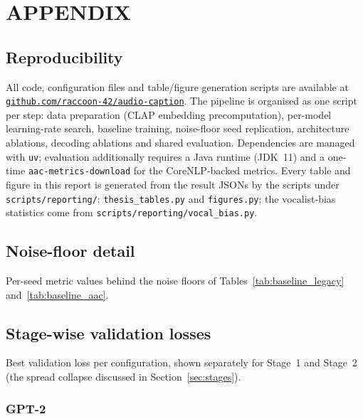 \documentclass[9pt]{report}
\begin{document}
\appendix
\chapter{APPENDIX}

\section{Reproducibility}
\begin{sloppypar}
All code, configuration files and table/figure generation scripts are available at
\href{https://github.com/raccoon-42/audio-caption}{\texttt{github.com/raccoon-42/audio-caption}}.
The pipeline is organised as one script per step: data preparation (CLAP embedding
precomputation), per-model learning-rate search, baseline training, noise-floor seed
replication, architecture ablations, decoding ablations and shared evaluation. Dependencies are
managed with \texttt{uv}; evaluation additionally requires a Java runtime (JDK~11) and a
one-time \texttt{aac-metrics-download} for the CoreNLP-backed metrics. Every table and figure
in this report is generated from the result JSONs by the scripts under
\texttt{scripts/reporting/}: \texttt{thesis\_tables.py} and \texttt{figures.py};
the vocalist-bias statistics come from \texttt{scripts/reporting/vocal\_bias.py}.
\end{sloppypar}

\section{Noise-floor detail}
Per-seed metric values behind the noise floors of
Tables~\ref{tab:baseline_legacy} and~\ref{tab:baseline_aac}.




\FloatBarrier
\section{Stage-wise validation losses}
Best validation loss per configuration, shown separately for Stage~1 and Stage~2 (the spread
collapse discussed in Section~\ref{sec:stages}).

\subsection*{GPT-2}


\end{document}
